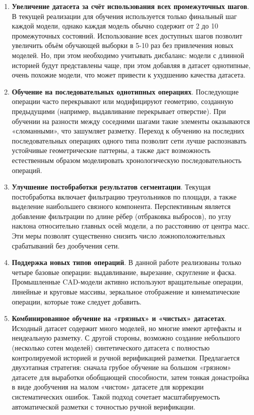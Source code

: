 \begin{enumerate}
    \item \textbf{Увеличение датасета за счёт использования всех промежуточных шагов}. В текущей реализации для обучения используется только финальный шаг каждой модели, однако каждая модель обычно содержит от 2 до 10 промежуточных состояний. Использование всех доступных шагов позволит увеличить объём обучающей выборки в 5-10 раз без привлечения новых моделей. Но, при этом необходимо учитывать дисбаланс: модели с длинной историей будут представлены чаще, при этом добавляя в датасет однотипные, очень похожие модели, что может привести к ухудшению качества датасета.

    \item \textbf{Обучение на последовательных однотипных операциях}. Последующие операции часто перекрывают или модифицируют геометрию, созданную предыдущими (например, выдавливание перекрывает отверстие). При обучении на разности между соседними шагами такие элементы оказываются «сломанными», что зашумляет разметку. Переход к обучению на последних последовательных операциях одного типа позволит сети лучше распознавать устойчивые геометрические паттерны, а также даст возможность естественным образом моделировать хронологическую последовательность операций.

    \item \textbf{Улучшение постобработки результатов сегментации}. Текущая постобработка включает фильтрацию треугольников по площади, а также выделение наибольшего связного компонента. Перспективным является добавление фильтрации по длине рёбер (отбраковка выбросов), по углу наклона относительно главных осей модели, а по расстоянию от центра масс. Эти меры позволят существенно снизить число ложноположительных срабатываний без дообучения сети.

    \item \textbf{Поддержка новых типов операций}. В данной работе реализованы только четыре базовые операции: выдавливание, вырезание, скругление и фаска. Промышленные CAD-модели активно используют вращательные операции, линейные и круговые массивы, зеркальное отображение и кинематические операции, которые тоже следует добавить.

    \item \textbf{Комбинированное обучение на «грязных» и «чистых» датасетах}. Исходный датасет содержит много моделей, но многие имеют артефакты и неидеальную разметку. С другой стороны, возможно создание небольшого (несколько сотен моделей) синтетического датасета с полностью контролируемой историей и ручной верификацией разметки. Предлагается двухэтапная стратегия: сначала грубое обучение на большом «грязном» датасете для выработки обобщающей способности, затем тонкая донастройка в виде дообучения на малом «чистом» датасете для коррекции систематических ошибок. Такой подход сочетает масштабируемость автоматической разметки с точностью ручной верификации.


\end{enumerate}
